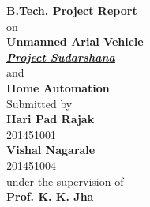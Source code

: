 \documentclass[12pt, oneside]{report}
\numberwithin{equation}{section}
\begin{document}
\thispagestyle{empty}
\begin{center}
{\large \bf B.Tech. Project Report\\ }
\vspace{0.5cm} {\large  on\\ }
\vspace*{0.06in} {\LARGE \bf Unmanned Arial Vehicle \\}
\vspace*{0.1in} {\LARGE \bf \textit{\underline{Project Sudarshana}} \\} \vspace*{0.1in}
\vspace{0.1cm} {\large  and\\ }
\vspace*{0.01in} {\LARGE \bf Home Automation \\}
\vspace{0.2in}
{ Submitted by} \\
\vspace{0.1in}
{\Large \bf Hari Pad Rajak } \\
{\large  201451001}\\
\vspace{0.1in}
{\Large \bf Vishal Nagarale } \\
{\large  201451004}\\
\vspace{0.2in}
{\large  under the supervision of\\ }
\vspace{.1in}
{\Large \bf Prof. K. K. Jha } \\
\vspace{.1in}
\vspace{0.1in}

\end{center}
\end{document}

